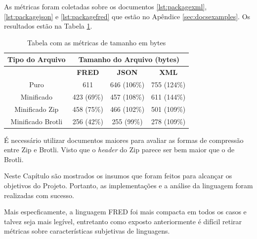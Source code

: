 As métricas foram coletadas sobre os documentos \ref{lst:packagexml}, \ref{lst:packagejson} e 
\ref{lst:packagefred} que estão no Apêndice \ref{sec:docsexamples}.
Os resultados estão na Tabela \ref{tbl:packagedocs}. 

\begin{table}[h!]
    \centering
	\caption{Tabela com as métricas de tamanho em bytes}
	\label{tbl:packagedocs}
    \begin{tabular}{cccc}
        \toprule
        \multicolumn{1}{c}{\textbf{Tipo do Arquivo}} & \multicolumn{3}{c}{\textbf{Tamanho do Arquivo (bytes)}} \\
        \midrule
                                                     & \textbf{FRED} & \textbf{JSON} & \textbf{XML}    \\
        \midrule
        Puro  & 611 & 646 (106\%) & 755 (124\%) \\
		Minificado & 423 (69\%) & 457 (108\%) & 611 (144\%) \\
        Minificado Zip & 458 (75\%) & 466 (102\%) & 501 (109\%)\\
        Minificado Brotli & 256 (42\%) & 255 (99\%) & 278 (109\%) \\
		\bottomrule
    \end{tabular}
\end{table}

É necessário utilizar documentos maiores para avaliar as formas de compressão entre
Zip e Brotli. Visto que o \textit{header} do Zip parece ser bem maior que o de 
Brotli.

Neste Capítulo são mostrados os insumos que foram feitos para alcançar os objetivos do Projeto. 
Portanto, as implementações e a análise da linguagem foram realizadas com sucesso. 

Mais especficamente, a linguagem FRED foi mais compacta em todos os casos e talvez seja mais legível, entretanto
como exposto anteriormente é difícil retirar métricas sobre características subjetivas 
de linguagens.